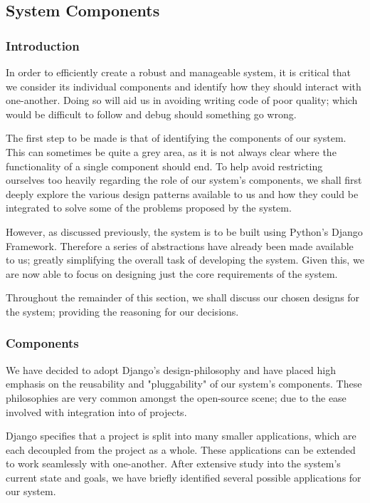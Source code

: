 \subsection{System Components}
	\subsubsection{Introduction}
		In order to efficiently create a robust and manageable system, it is critical that we consider its individual components and identify how they should interact with one-another. Doing so will aid us in avoiding writing code of poor quality; which would be difficult to follow and debug should something go wrong.
		
		The first step to be made is that of identifying the components of our system. This can sometimes be quite a grey area, as it is not always clear where the functionality of a single component should end. To help avoid restricting ourselves too heavily regarding the role of our system's components, we shall first deeply explore the various design patterns available to us and how they could be integrated to solve some of the problems proposed by the system.
	
		However, as discussed previously, the system is to be built using Python's Django Framework.  Therefore a series of abstractions have already been made available to us; greatly simplifying the overall task of developing the system. Given this, we are now able to focus on designing just the core requirements of the system.
		
		Throughout the remainder of this section, we shall discuss our chosen designs for the system; providing the reasoning for our decisions.
	
	\subsubsection{Components}
		We have decided to adopt Django's design-philosophy and have placed high emphasis on the reusability and "pluggability" of our system's components. These philosophies are very common amongst the open-source scene; due to the ease involved with integration into of projects.
		
		Django specifies that a project is split into many smaller applications, which are each decoupled from the project as a whole. These applications can be extended to work seamlessly with one-another. After extensive study into the system's current state and goals, we have briefly identified several possible applications for our system.
		
